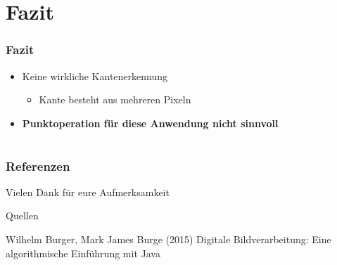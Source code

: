 \documentclass[12pt]{beamer}
\begin{document}
\section{Fazit}

\begin{frame}
	\frametitle{Fazit}
	\begin{itemize}
		\item Keine wirkliche Kantenerkennung 
		\begin{itemize}
			\item Kante besteht aus mehreren Pixeln
		\end{itemize}
		\item \textbf{Punktoperation für diese Anwendung nicht sinnvoll}		
	\end{itemize}
\end{frame}

\section*{}

\begin{frame}
	\frametitle{Referenzen}
	\Large{Vielen Dank für eure Aufmerksamkeit}	
	\newline
	\begin{block}{Quellen}
		\small{	
		\begin{thebibliography}{99} %
			 Wilhelm Burger, Mark James Burge (2015)
			\newblock Digitale Bildverarbeitung: Eine algorithmische Einführung mit Java
		\end{thebibliography}
		}
	\end{block}
\end{frame}
\end{document}
